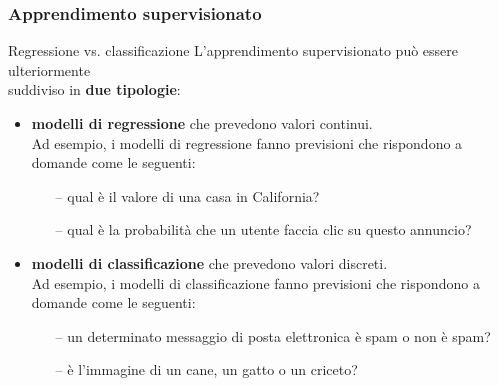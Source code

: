 \begin{frame}

	\frametitle{Apprendimento supervisionato}

	\begin{block}{Regressione vs. classificazione}
		L'apprendimento supervisionato può essere ulteriormente\\
		suddiviso in \textbf{due tipologie}:

		\begin{itemize}
			\item \textbf{modelli di regressione} che prevedono valori continui.\\
				\vspace{2mm}
				Ad esempio, i modelli di regressione fanno previsioni che rispondono a domande come le seguenti:
				\begin{itemize}
					\item[--] qual è il valore di una casa in California?
					\item[--] qual è la probabilità che un utente faccia clic su questo annuncio?
				\end{itemize}
				\vspace{2mm}
			\item \textbf{modelli di classificazione} che prevedono valori discreti.\\
				\vspace{2mm}
				Ad esempio, i modelli di classificazione fanno previsioni che rispondono a domande come le seguenti:
				\begin{itemize}
					\item[--] un determinato messaggio di posta elettronica è spam o non è spam?
					\item[--] è l'immagine di un cane, un gatto o un criceto?
				\end{itemize}
		\end{itemize}
	\end{block}


\end{frame}


